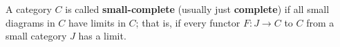 A category $C$ is called \textbf{small-complete} (usually just \textbf{complete}) if all small diagrams in $C$ have limits in $C$; that is, if every functor $F: J \to C$ to $C$ from a small category $J$ has a limit.
